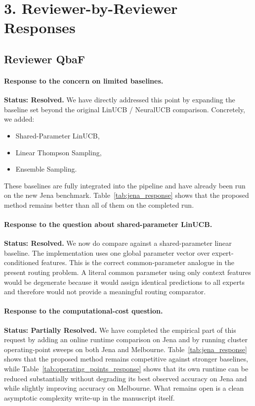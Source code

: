 \documentclass[11pt]{article}
\newcommand{\resolved}{\textbf{Resolved}}
\newcommand{\partialresolved}{\textbf{Partially Resolved}}
\begin{document}
\section*{3. Reviewer-by-Reviewer Responses}

\subsection*{Reviewer QbaF}

\paragraph{Response to the concern on limited baselines.}
\textbf{Status: \resolved.}
We have directly addressed this point by expanding the baseline set beyond the original LinUCB / NeuralUCB comparison. Concretely, we added:
\begin{itemize}[leftmargin=1.5em]
    \item Shared-Parameter LinUCB,
    \item Linear Thompson Sampling,
    \item Ensemble Sampling.
\end{itemize}
These baselines are fully integrated into the pipeline and have already been run on the new Jena benchmark. Table~\ref{tab:jena_response} shows that the proposed method remains better than all of them on the completed run.

\paragraph{Response to the question about shared-parameter LinUCB.}
\textbf{Status: \resolved.}
We now do compare against a shared-parameter linear baseline. The implementation uses one global parameter vector over expert-conditioned features. This is the correct common-parameter analogue in the present routing problem. A literal common parameter using only context features would be degenerate because it would assign identical predictions to all experts and therefore would not provide a meaningful routing comparator.

\paragraph{Response to the computational-cost question.}
\textbf{Status: \partialresolved.}
We have completed the empirical part of this request by adding an online runtime comparison on Jena and by running cluster operating-point sweeps on both Jena and Melbourne. Table~\ref{tab:jena_response} shows that the proposed method remains competitive against stronger baselines, while Table~\ref{tab:operating_points_response} shows that its own runtime can be reduced substantially without degrading its best observed accuracy on Jena and while slightly improving accuracy on Melbourne. What remains open is a clean asymptotic complexity write-up in the manuscript itself.
\end{document}

